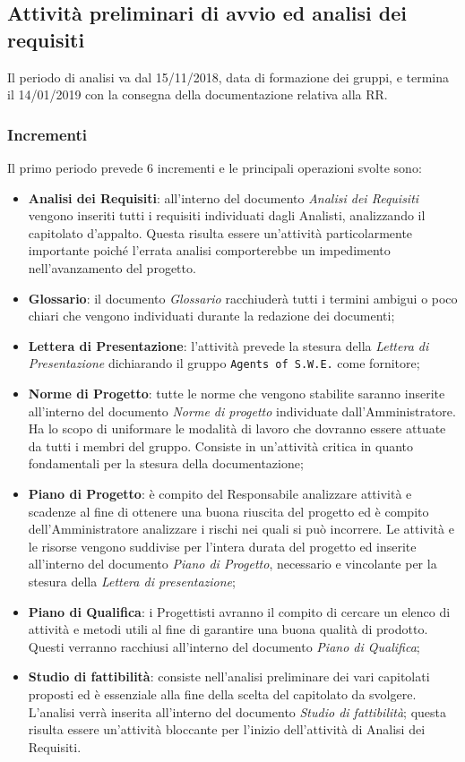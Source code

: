 \subsection{Attività preliminari di avvio ed analisi dei requisiti}

Il periodo di analisi va dal 15/11/2018, data di formazione dei gruppi, e termina il 14/01/2019 con la consegna della documentazione relativa alla RR.

\subsubsection{Incrementi}

Il primo periodo prevede 6 incrementi e le principali operazioni svolte sono: 
\begin{itemize}
	\item \textbf{Analisi dei Requisiti}: all'interno del documento \textit{Analisi dei Requisiti} vengono inseriti tutti i requisiti individuati dagli Analisti, analizzando il capitolato d'appalto. Questa risulta essere un'attività particolarmente importante poiché l'errata analisi comporterebbe un impedimento nell'avanzamento del progetto.
	\item \textbf{Glossario}: il documento \textit{Glossario} racchiuderà tutti i termini ambigui o poco chiari che vengono individuati durante la redazione dei documenti;
	\item \textbf{Lettera di Presentazione}: l'attività prevede la stesura della \textit{Lettera di Presentazione} dichiarando il gruppo \texttt{Agents of S.W.E.} come fornitore;
	\item \textbf{Norme di Progetto}: tutte le norme che vengono stabilite saranno inserite all'interno del documento \textit{Norme di progetto} individuate dall'Amministratore. Ha lo scopo di uniformare le modalità di lavoro che dovranno essere attuate da tutti i membri del gruppo. Consiste in un'attività critica in quanto fondamentali per la stesura della documentazione;
	\item \textbf{Piano di Progetto}: è compito del Responsabile analizzare attività e scadenze al fine di ottenere una buona riuscita del progetto ed è compito dell'Amministratore analizzare i rischi nei quali si può incorrere. Le attività e le risorse vengono suddivise per l'intera durata del progetto ed inserite all'interno del documento \textit{Piano di Progetto}, necessario e vincolante per la stesura della \textit{Lettera di presentazione};
	\item \textbf{Piano di Qualifica}: i Progettisti avranno il compito di cercare un elenco di attività e metodi utili al fine di garantire una buona qualità di prodotto. Questi verranno racchiusi all'interno del documento \textit{Piano di Qualifica};
	\item \textbf{Studio di fattibilità}: consiste nell'analisi preliminare dei vari capitolati proposti ed è essenziale alla fine della scelta del capitolato da svolgere. L'analisi verrà inserita all'interno del documento \textit{Studio di fattibilità}; questa risulta essere un'attività bloccante per l'inizio dell'attività di Analisi dei Requisiti.  
\end{itemize}

